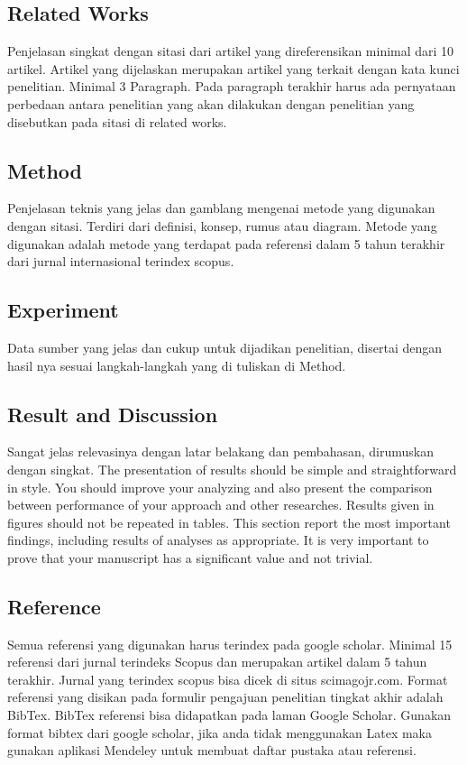 \subsection{Related Works}
Penjelasan singkat dengan sitasi dari artikel yang direferensikan minimal dari 10 artikel. Artikel yang dijelaskan merupakan artikel yang terkait dengan kata kunci penelitian. Minimal 3 Paragraph. Pada paragraph terakhir harus ada pernyataan perbedaan antara penelitian yang akan dilakukan dengan penelitian yang disebutkan pada sitasi di related works.

\subsection{Method}
Penjelasan teknis yang jelas dan gamblang mengenai metode yang digunakan dengan sitasi. Terdiri dari definisi, konsep, rumus atau diagram. Metode yang digunakan adalah metode yang terdapat pada referensi dalam 5 tahun terakhir  dari  jurnal  internasional  terindex  scopus. 

\subsection{Experiment}
Data sumber yang jelas dan cukup untuk dijadikan penelitian, disertai dengan hasil nya sesuai langkah-langkah yang di tuliskan di Method.

\subsection{Result and Discussion}
Sangat jelas relevasinya dengan latar belakang dan pembahasan, dirumuskan dengan singkat. The presentation of results should be simple and straightforward in style. You should improve your analyzing and also present the comparison between performance of your approach and other researches. Results given in figures should not be repeated in tables. This section report the most important findings, including results of analyses as appropriate. It is very important to prove that your manuscript has a significant value and not trivial.

\subsection{Reference}
Semua  referensi  yang  digunakan  harus  terindex  pada  google  scholar.   Minimal  15 referensi dari jurnal terindeks Scopus dan merupakan artikel dalam 5 tahun terakhir. Jurnal yang terindex scopus bisa dicek di situs scimagojr.com.  Format referensi yang disikan  pada  formulir  pengajuan  penelitian  tingkat  akhir  adalah  BibTex.   BibTex referensi bisa didapatkan pada laman Google Scholar. Gunakan format bibtex dari google scholar, jika anda tidak menggunakan Latex maka gunakan aplikasi Mendeley untuk membuat daftar pustaka atau referensi.

